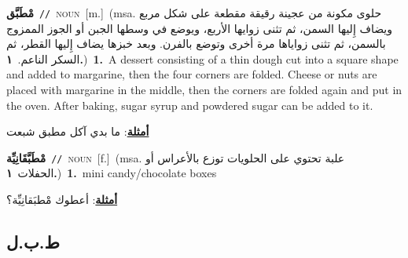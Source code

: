 \documentclass[10pt,a4paper,twoside]{article} %
\begin{document}
\begin{multicols}{2}
{{{{{{{{{{{{{\setlength\topsep{0pt}\textbf{\foreignlanguage{arabic}{مْطَبَّق}}\ {\color{gray}\texttt{//}\color{black}}\ \textsc{noun}\ [m.]\ \color{gray}(msa. \foreignlanguage{arabic}{حلوى مكونة من عجينة رقيقة مقطعة على شكل مربع ويضاف إِليها السمن، ثم تثنى زوايها الأربع، ويوضع في وسطها الجبن أو الجوز الممزوج بالسمن، ثم تثنى زواياها مرة أخرى وتوضع بالفرن. وبعد خبزها يضاف إِليها القطر، ثم السكر الناعم.}~\foreignlanguage{arabic}{\textbf{١.}})\color{black}\ \textbf{1.}~A dessert consisting of a thin dough cut into a square shape and added to margarine, then the four corners are folded. Cheese or nuts are placed with margarine in the middle, then the corners are folded again and put in the oven. After baking, sugar syrup and powdered sugar can be added to it.\  \begin{flushright}\color{gray}\foreignlanguage{arabic}{\textbf{\underline{\foreignlanguage{arabic}{أمثلة}}}: ما بدي آكل مطبق شبعت}\end{flushright}\color{black}} \vspace{2mm}

{\setlength\topsep{0pt}\textbf{\foreignlanguage{arabic}{مْطَبَّقَانِيِّة}}\ {\color{gray}\texttt{//}\color{black}}\ \textsc{noun}\ [f.]\ \color{gray}(msa. \foreignlanguage{arabic}{علبة تحتوي على الحلويات توزع بالأعراس أو الحفلات}~\foreignlanguage{arabic}{\textbf{١.}})\color{black}\ \textbf{1.}~mini candy/chocolate boxes\  \begin{flushright}\color{gray}\foreignlanguage{arabic}{\textbf{\underline{\foreignlanguage{arabic}{أمثلة}}}: أعطوك مْطبَقانِيِّة؟}\end{flushright}\color{black}} \vspace{2mm}

\vspace{-3mm}
\subsection*{\color{blue}\foreignlanguage{arabic}{ط.ب.ل}\color{blue}{}} 

}}}}}}}}}}}}
\end{multicols}
\end{document}
